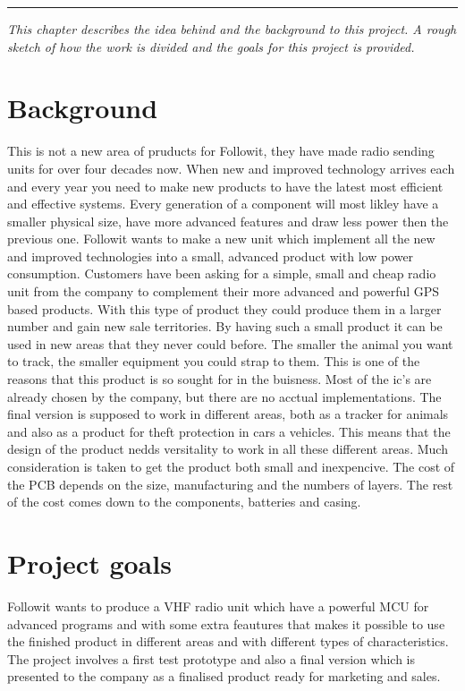 
\vspace{-10ex}%
\rule{\textwidth}{0.3pt}
\vspace{5ex}

\textit{ 
This chapter describes the idea behind and the background to this project. A rough sketch of how the work is divided and the goals for this project is provided.
}
\vspace{5ex}

\section{Background}
This is not a new area of pruducts for Followit, they have made radio sending units for over four decades now.
When new and improved technology arrives each and every year you need to make new products to have the latest most efficient and effective systems. Every generation of a component will most likley have a smaller physical size, have more advanced features and draw less power then the previous one. Followit wants to make a new unit which implement all the new and improved technologies into a small, advanced product with low power consumption. 
Customers have been asking for a simple, small and cheap radio unit from the company to complement their more advanced and powerful GPS based products. With this type of product they could produce them in a larger number and gain new sale territories. By having such a small product it can be used in new areas that they never could before. The smaller the animal you want to track, the smaller equipment you could strap to them. This is one of the reasons that this product is so sought for in the buisness. Most of the \gls{ic}'s are already chosen by the company, but there are no acctual implementations. The final version is supposed to work in different areas, both as a tracker for animals and also as a product for theft protection in cars a vehicles. This means that the design of the product nedds versitality to work in all these different areas.  
Much consideration is taken to get the product both small and inexpencive. The cost of the PCB depends on the size, manufacturing and the numbers of layers. The rest of the cost comes down to the components, batteries and casing.    \\

\section{Project goals}
Followit wants to produce a VHF radio unit which have a powerful MCU for advanced programs and with some extra feautures that makes it possible to use the finished product in different areas and with different types of characteristics. The project involves a first test prototype and also a final version which is presented to the company as a finalised product ready for marketing and sales. 

